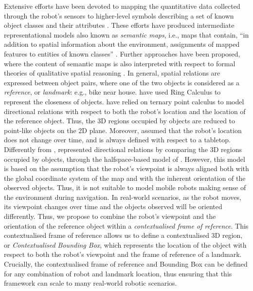 \documentclass{article}
\begin{document}
Extensive efforts have been devoted to mapping the quantitative data collected through the robot's sensors to higher-level symbols describing a set of known object classes and their attributes \cite{nuchter2008towards,coradeschi2003introduction,kostavelis2015semantic}. These efforts have produced intermediate representational models also known as \textit{semantic maps}, i.e., maps that contain, ``in addition to spatial information about the environment, assignments of mapped features to entities of known classes'' \cite{nuchter2008towards}. 
Further approaches have been proposed, where the content of semantic maps is also interpreted with respect to formal theories of qualitative spatial reasoning \cite{young_semantic_2017,kunze_combining_2014,deeken_grounding_2018}. In general, spatial relations are expressed between object pairs, where one of the two objects is considered as a \textit{reference}, or \textit{landmark}: e.g., bike near house. \cite{young_semantic_2017} have used Ring Calculus to represent the closeness of objects.  \cite{kunze_combining_2014} have relied on ternary point calculus \cite{moratz2008qualitative} to model directional relations with respect to both the robot's location and the location of the reference object. Thus, the 3D regions occupied by objects are reduced to point-like objects on the 2D plane. Moreover, \cite{kunze_combining_2014} assumed that the robot's location does not change over time, and is always defined with respect to a tabletop. Differently from \cite{kunze_combining_2014}, \cite{deeken_grounding_2018} represented directional relations by comparing the 3D regions occupied by objects, through the halfspace-based model of \cite{borrmann_query_2010}. However, this model is based on the assumption that the robot's viewpoint is always aligned both with the global coordinate system of the map and with the inherent orientation of the observed objects. Thus, it is not suitable to model mobile robots making sense of the environment during navigation. In real-world scenarios, as the robot moves, its viewpoint changes over time and the objects observed will be oriented differently.  
Thus, we propose to combine the robot's viewpoint and the orientation of the reference object within a \textit{contextualised frame of reference}. This contextualised frame of reference allows us to define a contextualised 3D region, or \textit{Contextualised Bounding Box}, which represents the location of the object with respect to both the robot's viewpoint and the frame of reference of a landmark. Crucially, the contextualised frame of reference and Bounding Box can be defined for any combination of robot and landmark location, thus ensuring that this framework can scale to many real-world robotic scenarios.    
  
\end{document}
